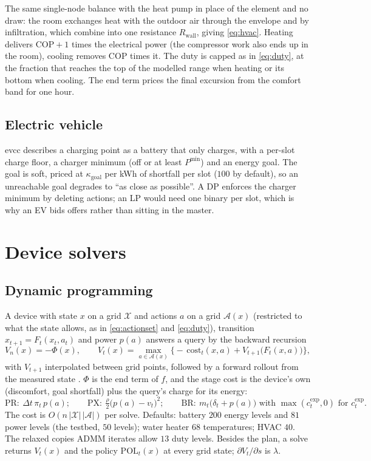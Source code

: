 \documentclass[11pt,a4paper]{article}
\newcommand{\dt}{\Delta t}
\newcommand{\cexp}{c^{\mathrm{exp}}}
\newcommand{\PR}{\mathrm{PR}}
\newcommand{\PX}{\mathrm{PX}}
\newcommand{\BR}{\mathrm{BR}}
\begin{document}
The same single-node balance with the heat pump in place of the element and no
draw: the room exchanges heat with the outdoor air through the envelope and by
infiltration, which combine into one resistance $R_{\mathrm{wall}}$, giving
\eqref{eq:hvac}. Heating delivers $\mathrm{COP} + 1$ times the electrical power
(the compressor work also ends up in the room), cooling removes $\mathrm{COP}$
times it. The duty is capped as in \eqref{eq:duty}, at the fraction that reaches
the top of the modelled range when heating or its bottom when cooling. The end
term prices the final excursion from the comfort band for one hour.

\subsection{Electric vehicle}

evcc describes a charging point as a battery that only charges, with a
per-slot charge floor, a charger minimum (off or at least $P^{\min}$) and an
energy goal. The goal is soft, priced at $\kappa_{\mathrm{goal}}$ per kWh of
shortfall per slot ($100$ by default), so an unreachable goal degrades to ``as
close as possible''. A DP enforces the charger minimum by deleting actions; an LP
would need one binary per slot, which is why an EV bids offers rather than
sitting in the master.

\section{Device solvers}
\label{app:solvers}

\subsection{Dynamic programming}
\label{app:dp}

A device with state $x$ on a grid $\mathcal X$ and actions $a$ on a grid
$\mathcal A(x)$ (restricted to what the state allows, as in
\eqref{eq:actionset} and \eqref{eq:duty}), transition $x_{t+1} = F_t(x_t, a_t)$
and power $p(a)$ answers a query by the backward recursion
\begin{equation}
  V_n(x) = -\Phi(x), \qquad
  V_t(x) = \max_{a \in \mathcal A(x)} \Big\{ -\,\text{cost}_t(x, a) + V_{t+1}\big(F_t(x,a)\big) \Big\},
  \label{eq:bellman}
\end{equation}
with $V_{t+1}$ interpolated between grid points, followed by a forward rollout
from the measured state \cite{bertsekas2017}. $\Phi$ is the end term of $f$, and
the stage cost is the device's own (discomfort, goal shortfall) plus the query's
charge for its energy:
\[
  \PR:\ \dt\,\pi_t\,p(a); \qquad
  \PX:\ \tfrac{\rho}{2}\big(p(a) - v_t\big)^2; \qquad
  \BR:\ m_t\big(\delta_t + p(a)\big) \text{ with } \max(\cexp_t, 0) \text{ for } \cexp_t .
\]
The cost is $O(n\,|\mathcal X|\,|\mathcal A|)$ per solve. Defaults: battery
$200$ energy levels and $81$ power levels (the testbed, $50$ levels); water heater
$68$ temperatures; HVAC $40$. The relaxed copies ADMM iterates allow $13$ duty
levels. Besides the plan, a solve returns $V_t(x)$ and the policy
$\mathrm{POL}_t(x)$ at every grid state; $\partial V_t/\partial s$ is $\lambda$.
\end{document}
